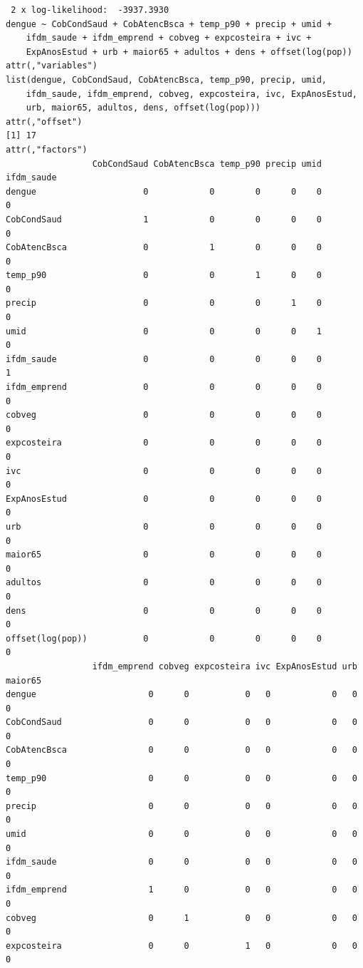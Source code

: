 \documentclass[12pt,a4paper]{article}\usepackage[]{graphicx}\usepackage[]{color}
\makeatletter
\newenvironment{kframe}{%
 \def\at@end@of@kframe{}%
 \ifinner\ifhmode%
  \def\at@end@of@kframe{\end{minipage}}%
  \begin{minipage}{\columnwidth}%
 \fi\fi%
 \def\FrameCommand##1{\hskip\@totalleftmargin \hskip-\fboxsep
 \colorbox{shadecolor}{##1}\hskip-\fboxsep
     \hskip-\linewidth \hskip-\@totalleftmargin \hskip\columnwidth}%
 \MakeFramed {\advance\hsize-\width
   \@totalleftmargin\z@ \linewidth\hsize
   \@setminipage}}%
 {\par\unskip\endMakeFramed%
 \at@end@of@kframe}
\newenvironment{knitrout}{}{} %
\makeatother
\begin{document}
\begin{knitrout}
\begin{kframe}
\begin{verbatim}
 2 x log-likelihood:  -3937.3930 
dengue ~ CobCondSaud + CobAtencBsca + temp_p90 + precip + umid + 
    ifdm_saude + ifdm_emprend + cobveg + expcosteira + ivc + 
    ExpAnosEstud + urb + maior65 + adultos + dens + offset(log(pop))
attr(,"variables")
list(dengue, CobCondSaud, CobAtencBsca, temp_p90, precip, umid, 
    ifdm_saude, ifdm_emprend, cobveg, expcosteira, ivc, ExpAnosEstud, 
    urb, maior65, adultos, dens, offset(log(pop)))
attr(,"offset")
[1] 17
attr(,"factors")
                 CobCondSaud CobAtencBsca temp_p90 precip umid ifdm_saude
dengue                     0            0        0      0    0          0
CobCondSaud                1            0        0      0    0          0
CobAtencBsca               0            1        0      0    0          0
temp_p90                   0            0        1      0    0          0
precip                     0            0        0      1    0          0
umid                       0            0        0      0    1          0
ifdm_saude                 0            0        0      0    0          1
ifdm_emprend               0            0        0      0    0          0
cobveg                     0            0        0      0    0          0
expcosteira                0            0        0      0    0          0
ivc                        0            0        0      0    0          0
ExpAnosEstud               0            0        0      0    0          0
urb                        0            0        0      0    0          0
maior65                    0            0        0      0    0          0
adultos                    0            0        0      0    0          0
dens                       0            0        0      0    0          0
offset(log(pop))           0            0        0      0    0          0
                 ifdm_emprend cobveg expcosteira ivc ExpAnosEstud urb maior65
dengue                      0      0           0   0            0   0       0
CobCondSaud                 0      0           0   0            0   0       0
CobAtencBsca                0      0           0   0            0   0       0
temp_p90                    0      0           0   0            0   0       0
precip                      0      0           0   0            0   0       0
umid                        0      0           0   0            0   0       0
ifdm_saude                  0      0           0   0            0   0       0
ifdm_emprend                1      0           0   0            0   0       0
cobveg                      0      1           0   0            0   0       0
expcosteira                 0      0           1   0            0   0       0

\end{verbatim}
\end{kframe}
\end{knitrout}
\end{document}
